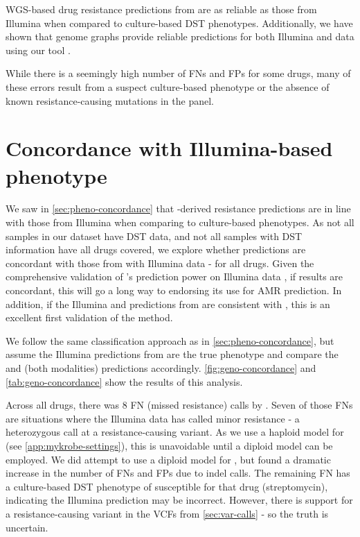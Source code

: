 WGS-based drug resistance predictions from \ont{} are as reliable as those from Illumina when compared to culture-based DST phenotypes. Additionally, we have shown that genome graphs provide reliable predictions for both Illumina and \ont{} data using our tool \drprg{}.

While there is a seemingly high number of FNs and FPs for some drugs, many of these errors result from a suspect culture-based phenotype or the absence of known resistance-causing mutations in the panel.

\section{Concordance with Illumina-based phenotype}
\label{sec:geno-concordance}

We saw in \autoref{sec:pheno-concordance} that \ont{}-derived resistance predictions are in line with those from Illumina when comparing to culture-based phenotypes. As not all samples in our dataset have DST data, and not all samples with DST information have all drugs covered, we explore whether \ont{} predictions are concordant with those from \mykrobe{} with Illumina data - for all drugs. Given the comprehensive validation of \mykrobe{}'s prediction power on Illumina data \cite{hunt2019}, if \ont{} results are concordant, this will go a long way to endorsing its use for AMR prediction. In addition, if the Illumina and \ont{} predictions from \drprg{} are consistent with \mykrobe{}, this is an excellent first validation of the method.

We follow the same classification approach as in \autoref{sec:pheno-concordance}, but assume the Illumina predictions from \mykrobe{} are the true phenotype and compare the \mykrobe{} \ont{} and \drprg{} (both modalities) predictions accordingly. \autoref{fig:geno-concordance} and \autoref{tab:geno-concordance} show the results of this analysis.

Across all drugs, there was 8 FN (missed resistance) calls by \mykrobe{} \ont{}. Seven of those FNs are situations where the Illumina data has called minor resistance - a heterozygous call at a resistance-causing variant. As we use a haploid model for \ont{} (see \autoref{app:mykrobe-settings}), this is unavoidable until a diploid model can be employed. We did attempt to use a diploid model for \ont{}, but found a dramatic increase in the number of FNs and FPs due to indel calls. The remaining \ont{} FN has a culture-based DST phenotype of susceptible for that drug (streptomycin), indicating the Illumina prediction may be incorrect. However, there is support for a resistance-causing variant in the VCFs from \autoref{sec:var-calls} - so the truth is uncertain.

